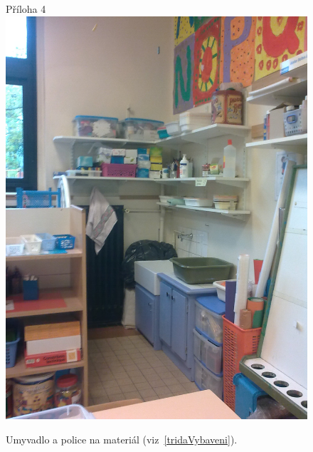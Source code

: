 	\begin{figure}[tb]
		\centering
		Příloha 4\\
		\includegraphics[height = 0.35\textheight]{./fotky/Obr4.jpg}
		\caption{
			Umyvadlo a police na materiál (viz~\ref{tridaVybaveni}).
		}
		\label{Obr4}
	\end{figure}

